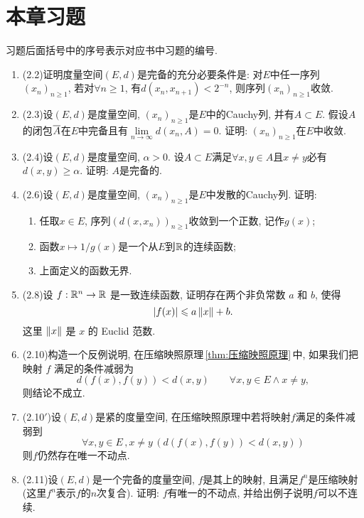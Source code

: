     \section*{本章习题}

    习题后面括号中的序号表示对应书中习题的编号.

    \begin{enumerate}[label=\textbf{\arabic*.}, ref=\arabic*]
    \item (2.2)证明度量空间$ (E,d) $是完备的充分必要条件是: 对$ E $中任一序列$ (x_n)_{n\geqslant 1} $, 若对$ \forall n\geqslant 1 $, 有$ d(x_n,x_{n+1})<2^{-n} $, 则序列$ (x_n)_{n\geqslant 1} $收敛.
    \item (2.3)设$ (E,d) $是度量空间, $ (x_n)_{n\geqslant 1} $是$ E $中的Cauchy列, 并有$ A\subset E $. 假设$ A $的闭包$ \baro{A} $在$ E $中完备且有$ \lim\limits_{n\to\infty}d(x_n,A)=0 $. 证明: $ (x_n)_{n\geqslant 1} $在$ E $中收敛.
    \item (2.4)设$ (E,d) $是度量空间, $ \alpha>0 $. 设$ A\subset E $满足$ \forall x,y\in A $且$ x\ne y $必有$ d(x,y)\geqslant\alpha $. 证明: $ A $是完备的.
    \item (2.6)设$ (E,d) $是度量空间, $ (x_n)_{n\geqslant 1} $是$ E $中发散的Cauchy列. 证明:
        \begin{enumerate}[(1)]
        \item 任取$ x\in E $, 序列$ (d(x,x_n))_{n\geqslant 1} $收敛到一个正数, 记作$ g(x) $;
        \item 函数$ x\mapsto1/g(x) $是一个从$ E $到$ \R $的连续函数;
        \item 上面定义的函数无界.
        \end{enumerate}
    \item (2.8)设 $ f: \R^{n}\to\R $ 是一致连续函数, 证明存在两个非负常数 $ a $ 和 $ b $, 使得
        \[
            \abs{f(x)}\leqslant a\norm{x}+b.
        \]
        这里 $ \norm{x} $ 是 $ x $ 的 Euclid 范数.
    \item (2.10)构造一个反例说明, 在压缩映照原理\,\ref{thm:压缩映照原理}\,中, 如果我们把映射 $ f $ 满足的条件减弱为
        \[
            d(f(x), f(y))<d(x, y)\qquad \forall x, y\in E\wedge x\neq y,
        \]
        则结论不成立.
    \item (2.10$ ' $)设$ (E,d) $是紧的度量空间, 在压缩映照原理中若将映射$ f $满足的条件减弱到
        \[
        \forall x,y\in E\,,x\ne y\,(d(f(x),f(y))<d(x,y))
        \]
        则$ f $仍然存在唯一不动点.
    \item (2.11)设$ (E,d) $是一个完备的度量空间, $ f $是其上的映射, 且满足$ f^n $是压缩映射(这里$ f^n $表示$ f $的$ n $次复合). 证明: $ f $有唯一的不动点, 并给出例子说明$ f $可以不连续.

\end{enumerate}
